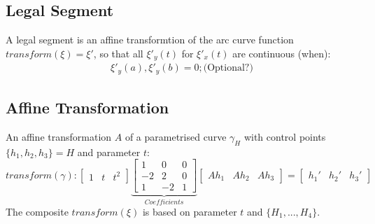 \documentclass{report}
\begin{document}
\subsection{Legal Segment}
A legal segment is an affine transformtion of the arc curve function $transform(\xi) = \xi'$, so that all $\xi'_{y}(t)$ for $\xi'_{x}(t)$ are continuous (when):
\begin{align}
\xi'_{y}(a), \xi'_{y}(b) = 0; \text{(Optional?)}
\end{align}

\subsection{Affine Transformation}
An affine transformation $A$ of a parametrised curve $\gamma_{H}$ with control points $\{h_{1},h_{2},h_{3}\} = H$ and parameter $t$:
\begin{equation}
transform(\gamma):
\begin{bmatrix}
1 & t & t^2
\end{bmatrix}
\underbrace{\begin{bmatrix}
1 & 0 & 0\\
-2 & 2 & 0\\
1 & -2 &1
\end{bmatrix}}_{Coefficients}
\begin{bmatrix}
Ah_{1} & Ah_{2} & Ah_{3}
\end{bmatrix}
=
\begin{bmatrix}
h_{1}' & h_{2}' & h_{3}'
\end{bmatrix}
\end{equation}
The composite $transform(\xi)$ is based on parameter $t$ and $\{H_{1}, ... ,H_{4}\}$.
\end{document}
